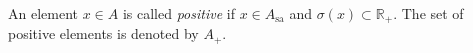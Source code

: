 An element $x \in A$ is called \textit{positive} if $x \in A_{\mathrm{sa}}$ and $\sigma(x) \subset \mathbb{R}_+$. The set of positive elements is denoted by $A_+$.
